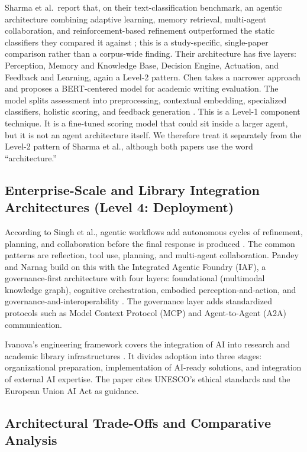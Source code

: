 \documentclass[sn-basic,Numbered]{sn-jnl}
\begin{document}
Sharma et al.\ report that, on their text-classification benchmark,
an agentic architecture combining adaptive learning, memory retrieval,
multi-agent collaboration, and reinforcement-based refinement
outperformed the static classifiers they compared it against
\cite{sharma2025textclassification}; this is a study-specific,
single-paper comparison rather than a corpus-wide finding. Their
architecture has five layers: Perception, Memory and Knowledge Base,
Decision Engine, Actuation, and Feedback and Learning, again a Level-2
pattern. Chen takes a narrower approach and proposes a BERT-centered model for
academic writing evaluation. The model splits assessment into
preprocessing, contextual embedding, specialized classifiers, holistic
scoring, and feedback generation \cite{chen2025emiwriting}. This is a
Level-1 component technique. It is a fine-tuned scoring model that could
sit inside a larger agent, but it is not an agent architecture itself.
We therefore treat it separately from the Level-2 pattern of Sharma et
al., although both papers use the word ``architecture.''

\subsection{Enterprise-Scale and Library Integration Architectures (Level 4: Deployment)}
\label{sec:enterprise}

According to Singh et al., agentic workflows add autonomous cycles of
refinement, planning, and collaboration before the final response is
produced \cite{singh2024agenticworkflows}. The common patterns are
reflection, tool use, planning, and multi-agent collaboration. Pandey
and Narnag build on this with the Integrated Agentic Foundry (IAF), a
governance-first architecture with four layers: foundational
(multimodal knowledge graph), cognitive orchestration, embodied
perception-and-action, and governance-and-interoperability
\cite{pandey2025agenticenterprise}. The governance layer adds
standardized protocols such as Model Context Protocol (MCP) and
Agent-to-Agent (A2A) communication.

Ivanova's engineering framework covers the integration of AI into
research and academic library infrastructures \cite{ivanova2025libraryai}.
It divides adoption into three stages: organizational preparation,
implementation of AI-ready solutions, and integration of external AI
expertise. The paper cites UNESCO's ethical standards and the European
Union AI Act as guidance.

\subsection{Architectural Trade-Offs and Comparative Analysis}
\end{document}
